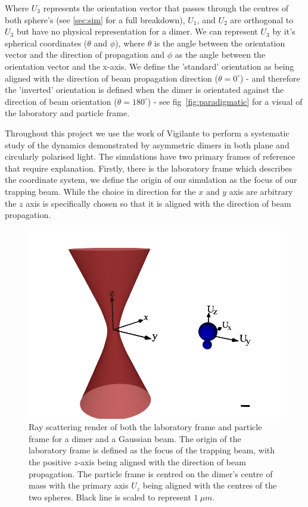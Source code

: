 Where $U_3$ represents the orientation vector that passes
through the centres of both sphere's (see \ref{sec:sim} 
for a full breakdown), $U_1$, and $U_2$ are orthogonal to 
$U_3$ but have no physical representation for a dimer. We 
can represent $U_3$ by it's spherical coordinates ($\theta$ 
and $\phi$), where $\theta$ is the angle between the 
orientation vector and the direction of propagation and 
$\phi$ as the angle between the orientation vector and 
the x-axis. We define the 'standard' orientation as 
being aligned with the direction of beam propagation 
direction ($\theta=0^\circ$) - and therefore the 'inverted' 
orientation is defined when the dimer is orientated against 
the direction of beam orientation ($\theta=180^\circ$) - see
fig~\ref{fig:paradigmatic} for a visual of the laboratory and
particle frame. 

Throughout this project we use the work of Vigilante \cite{Vigilante2020} 
to perform a systematic study of the dynamics demonstrated by 
asymmetric dimers in both plane and circularly polarised light. 
The simulations have two primary frames of reference that require 
explanation. Firstly, there is the laboratory frame which 
describes the coordinate system, we define the origin of our 
simulation as the focus of our trapping beam. While the choice in 
direction for the $x$ and $y$ axis are arbitrary the $z$ axis is 
specifically chosen so that it is aligned with the direction of 
beam propagation. 
\begin{figure}[h!]
	\centering
	\includegraphics[width=0.6\linewidth]{lab_frame.png}
	\caption{Ray scattering render of both the laboratory frame and 
		particle frame for a dimer and a Gaussian beam. The origin 
		of the laboratory frame is defined as the focus of the 
		trapping beam, with the positive $z$-axis being aligned with 
		the direction of beam propagation. The particle frame is 
		centred on the dimer's centre of mass with the primary axis 
		$U_z$ being aligned with the centres of the two spheres. Black 
		line is scaled to represent $1\ \mu m$.}
	\label{fig:lab_frame} 
\end{figure} 

